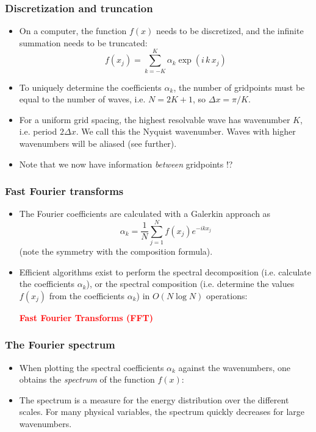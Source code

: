 \documentclass[aspectratio=149,9pt]{beamer}
\begin{document}
\begin{frame}
	\frametitle{Discretization and truncation}
	\vfill\begin{itemize}
		\item On a computer, the function $f(x)$ needs to be discretized, and the infinite summation needs to be truncated:
			\begin{equation*}
				f(x_j)=\sum_{k=-K}^K\alpha_k\exp(i \, k \, x_j)
			\end{equation*}\vfill
		\item To uniquely determine the coefficients $\alpha_k$, the number of gridpoints must be equal to the number of waves, i.e. $N=2K+1$, so $\Delta x=\pi/K$.\vfill
		\item For a uniform grid spacing, the highest resolvable wave has wavenumber $K$, i.e. period $2\Delta x$. We call this the Nyquist wavenumber. Waves with higher wavenumbers will be aliased (see further).\vfill
		\item Note that we now have information \emph{between} gridpoints !?
	\end{itemize}\vfill
\end{frame}
%
%
\begin{frame}
	\frametitle{Fast Fourier transforms}
	\vfill\begin{itemize}
		\item The Fourier coefficients are calculated with a Galerkin approach as
			\begin{equation*}
				\alpha_k=\frac{1}{N}\sum_{j=1}^{N} f(x_j) e^{-i k x_j}
			\end{equation*}
			(note the symmetry with the composition formula).\vfill
		\item Efficient algorithms exist to perform the spectral decomposition (i.e. calculate the coefficients $\alpha_k$), or the spectral composition (i.e. determine the values $f(x_j)$ from the coefficients $\alpha_k$) in $O(N\log N)$ operations:\vfill
			\begin{center}
				\textcolor{red}{\Large\bfseries
					Fast Fourier Transforms (FFT)
				}
			\end{center}
	\end{itemize}\vfill
\end{frame}
%
%
\begin{frame}
	\frametitle{The Fourier spectrum}
	\vfill\begin{itemize}
		\item When plotting the spectral coefficients $\alpha_k$ against the wavenumbers, one obtains the \emph{spectrum} of the function $f(x)$:
			\begin{center}
				\scalebox{.7}{\small}
			\end{center}\vfill
		\item The spectrum is a measure for the energy distribution over the different scales. For many physical variables, the spectrum quickly decreases for large wavenumbers.
	\end{itemize}\vfill
\end{frame}
\end{document}
